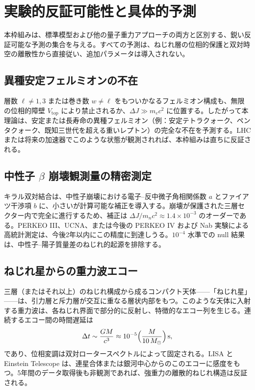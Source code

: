 \documentclass[dvipdfmx,a4paper]{article}
\begin{document}
\section{実験的反証可能性と具体的予測}

本枠組みは、標準模型および他の量子重力アプローチの両方と区別する、鋭い反証可能な予測の集合を与える。すべての予測は、ねじれ層の位相的保護と双対時空の離散性から直接従い、追加パラメータは導入されない。

\subsection{異種安定フェルミオンの不在}

層数 \(\ell \neq 1,3\) または巻き数 \(w \neq \ell\) をもついかなるフェルミオン構成も、無限の位相的障壁 \(V_\text{top}\) により禁止されるか、\(\Delta J \gg m_e c^2\) に位置する。したがって本理論は、安定または長寿命の異種フェルミオン（例：安定テトラクォーク、ペンタクォーク、既知三世代を超える重いレプトン）の完全な不在を予測する。LHC または将来の加速器でこのような状態が観測されれば、本枠組みは直ちに反証される。

\subsection{中性子 \texorpdfstring{$\beta$}{beta} 崩壊観測量の精密測定}

キラル双対結合は、中性子崩壊における電子--反中微子角相関係数 \(a\) とファイアツ干渉項 \(b\) に、小さいが計算可能な補正を導入する。崩壊が保護された三層セクター内で完全に進行するため、補正は \(\Delta J / m_n c^2 \approx 1.4 \times 10^{-3}\) のオーダーである。PERKEO III、UCNA、または今後の PERKEO IV および Nab 実験による高統計測定は、今後2年以内にこの精度に到達しうる。\(10^{-4}\) 水準での null 結果は、中性子--陽子質量差のねじれ的起源を排除する。

\subsection{ねじれ星からの重力波エコー}

三層（またはそれ以上）のねじれ構成から成るコンパクト天体——「ねじれ星」——は、引力層と斥力層が交互に重なる層状内部をもつ。このような天体に入射する重力波は、各ねじれ界面で部分的に反射し、特徴的なエコー列を生じる。連続するエコー間の時間遅延は
\[
\Delta t \sim \frac{GM}{c^3} \approx 10^{-5}\Bigl(\frac{M}{10\,M_\odot}\Bigr)\,\mathrm{s},
\]
であり、位相変調は双対ロータースペクトルによって固定される。LISA と Einstein Telescope は、連星合体または銀河中心からのこのエコーに感度をもつ。5年間のデータ取得後も非観測であれば、強重力の離散的ねじれ構造は反証される。
\end{document}
